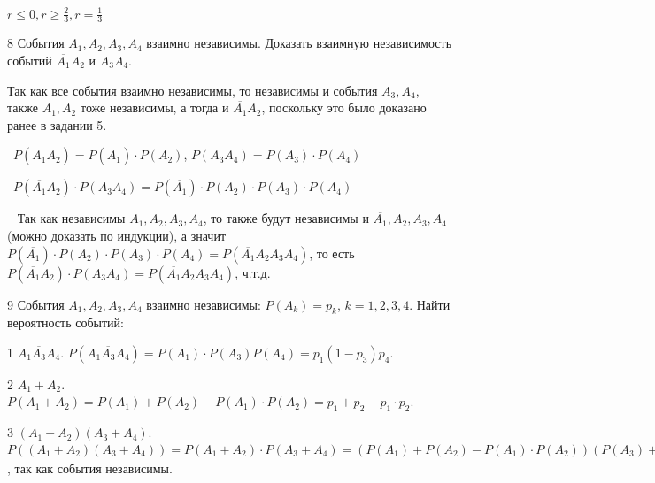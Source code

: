 \begin{result}
  $r \le 0, r \ge \frac{2}{3}, r = \frac{1}{3}$
\end{result}

\medskip
\begin{task}{8}
  События $A_1, A_2,A_3,A_4$ взаимно независимы. Доказать взаимную независимость событий $\overline{A_1}A_2$ 
  и $A_3 A_4$.
\end{task}

\begin{solution}
Так как все события взаимно независимы, то независимы и события $A_3, A_4$, также $A_1,A_2$ тоже независимы,
а тогда и $\overline{A_1}A_2$, поскольку это было доказано ранее в задании 5.

\medskip
\noindent\textbullet~$P(\overline{A_1}A_2) = P(\overline{A_1}) \cdot P(A_2)$, $P(A_3A_4) = P(A_3) \cdot P(A_4)$

\medskip
\noindent\textbullet~$P(\overline{A_1}A_2)\cdot P(A_3A_4) = P(\overline{A_1}) \cdot P(A_2) \cdot  P(A_3) \cdot P(A_4)$

\medskip
\noindent\textbullet~ Так как независимы $A_1, A_2, A_3, A_4$, то также будут независимы и $\overline{A_1},
A_2, A_3, A_4$ (можно доказать по индукции), а значит $P(\overline{A_1}) \cdot P(A_2) \cdot  P(A_3) \cdot P(A_4) = P(\overline{A_1}A_2A_3A_4)$, 
то есть $P(\overline{A_1}A_2)\cdot P(A_3A_4) = P(\overline{A_1}A_2A_3A_4)$, ч.т.д.
\end{solution}

\medskip
\begin{task}{9}
  События $A_1,A_2,A_3,A_4$ взаимно независимы: $P(A_k) = p_k$, $k = 1, 2, 3, 4$. Найти вероятность
  событий:
\end{task}

\begin{subtask}{1}
  $A_1\overline{A_3}A_4$. $P(A_1\overline{A_3}A_4) = P(A_1)\cdot P(A_3)P(A_4) = p_1 (1 - p_3)p_4$.
\end{subtask}

\begin{subtask}{2}
  $A_1 + A_2$.  $P(A_1 + A_2) =  P(A_1) + P(A_2) - P(A_1)\cdot P(A_2) = p_1 + p_2 - p_1 \cdot p_2$.
\end{subtask}

\begin{subtask}{3}
  $(A_1 + A_2) (A_3 + A_4)$. $P((A_1 + A_2) (A_3 + A_4)) = 
  P(A_1 + A_2) \cdot P(A_3 + A_4) = (P(A_1) + P(A_2) - P(A_1)\cdot P(A_2)) (P(A_3) + P(A_4) - P(A_3) \cdot P(A_4)) =
  (p_1 + p_2 - p_1 \cdot p_2) (p_3 + p_4 - p_3 \cdot p_4) $, так как события независимы.
\end{subtask}

